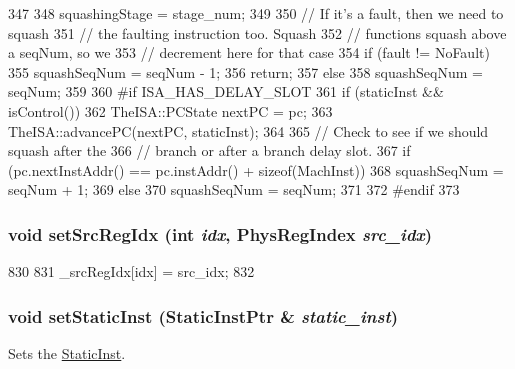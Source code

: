 \begin{DoxyCode}
347 {
348     squashingStage = stage_num;
349 
350     // If it's a fault, then we need to squash
351     // the faulting instruction too. Squash
352     // functions squash above a seqNum, so we
353     // decrement here for that case
354     if (fault != NoFault) {
355         squashSeqNum = seqNum - 1;
356         return;
357     } else
358         squashSeqNum = seqNum;
359 
360 #if ISA_HAS_DELAY_SLOT
361     if (staticInst && isControl()) {
362         TheISA::PCState nextPC = pc;
363         TheISA::advancePC(nextPC, staticInst);
364 
365         // Check to see if we should squash after the
366         // branch or after a branch delay slot.
367         if (pc.nextInstAddr() == pc.instAddr() + sizeof(MachInst))
368             squashSeqNum = seqNum + 1;
369         else
370             squashSeqNum = seqNum;
371     }
372 #endif
373 }
\end{DoxyCode}
\hypertarget{classInOrderDynInst_a45e8ff35e5bd48f665ecbd309edc554d}{
\subsubsection[{setSrcRegIdx}]{\setlength{\rightskip}{0pt plus 5cm}void setSrcRegIdx (int {\em idx}, \/  {\bf PhysRegIndex} {\em src\_\-idx})}}
\label{classInOrderDynInst_a45e8ff35e5bd48f665ecbd309edc554d}



\begin{DoxyCode}
830     {
831         _srcRegIdx[idx] = src_idx;
832     }
\end{DoxyCode}
\hypertarget{classInOrderDynInst_a26017c8613960be6f4be6409425efa85}{
\subsubsection[{setStaticInst}]{\setlength{\rightskip}{0pt plus 5cm}void setStaticInst ({\bf StaticInstPtr} \& {\em static\_\-inst})}}
\label{classInOrderDynInst_a26017c8613960be6f4be6409425efa85}
Sets the \hyperlink{classStaticInst}{StaticInst}. 


